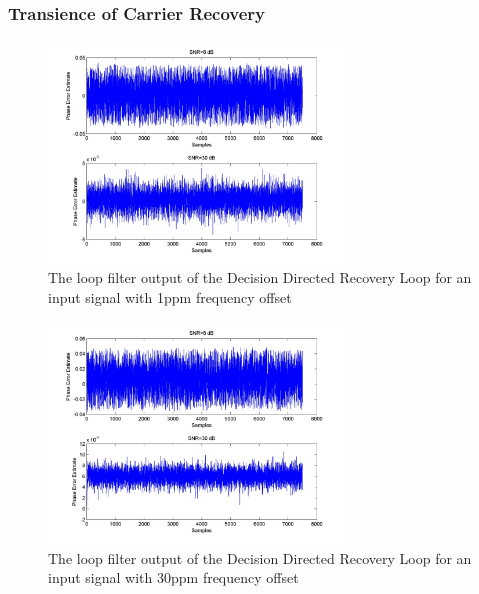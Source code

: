 \documentclass[]{article}
\begin{document}
\subsubsection{Transience of Carrier Recovery}
\begin{figure}[H]
\centering
\hspace*{-2cm}\includegraphics[width=0.7\textwidth]{qpLoopFilterfo_ddr1.jpg}
\caption{The loop filter output of the Decision Directed Recovery Loop for an input signal with 1ppm frequency offset}
\end{figure}

\begin{figure}[H]
\centering
\hspace*{-2cm}\includegraphics[width=0.7\textwidth]{qpLoopFilterfo_ddr2.jpg}
\caption{The loop filter output of the Decision Directed Recovery Loop for an input signal with 30ppm frequency offset}
\end{figure}
\end{document}
